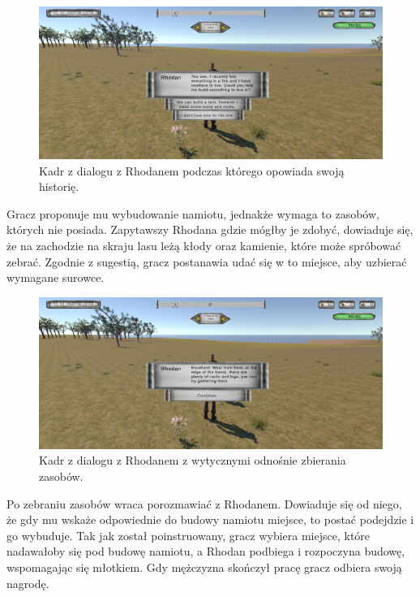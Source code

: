 \begin{figure}[h!]
    \centering
    \includegraphics[width=1\textwidth]{images/rozgrywka/rhodan3.png}
    \caption{Kadr z dialogu z Rhodanem podczas którego opowiada swoją historię.}
\end{figure}

Gracz proponuje mu wybudowanie namiotu, jednakże wymaga to zasobów, których nie posiada. Zapytawszy Rhodana gdzie mógłby
je zdobyć, dowiaduje się, że na zachodzie na skraju lasu leżą kłody oraz kamienie, które może spróbować zebrać. Zgodnie
z sugestią, gracz postanawia udać się w to miejsce, aby uzbierać wymagane surowce.

\begin{figure}[h!]
    \centering
    \includegraphics[width=1\textwidth]{images/rozgrywka/rhodan4.png}
    \caption{Kadr z dialogu z Rhodanem z wytycznymi odnośnie zbierania zasobów.}
\end{figure}

Po zebraniu zasobów wraca porozmawiać z Rhodanem. Dowiaduje się od niego, że gdy mu wskaże odpowiednie do budowy namiotu
miejsce, to postać podejdzie i go wybuduje. Tak jak został poinstruowany, gracz wybiera miejsce, które nadawałoby się
pod budowę namiotu, a Rhodan podbiega i rozpoczyna budowę, wspomagając się młotkiem. Gdy mężczyzna skończył pracę gracz
odbiera swoją nagrodę.

